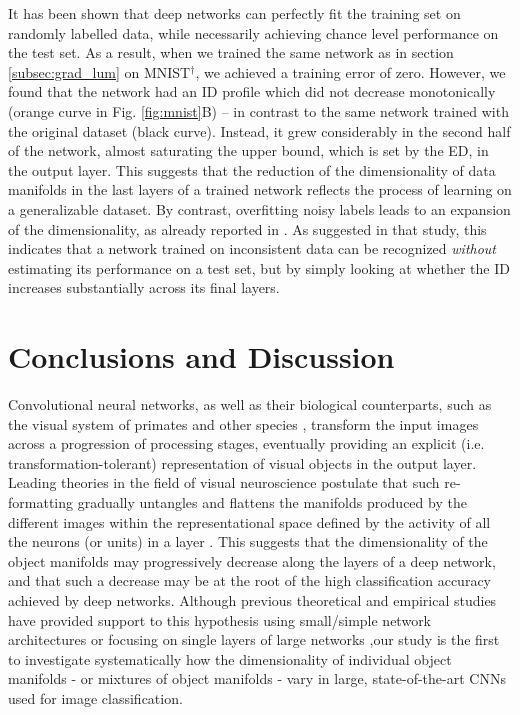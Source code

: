 \documentclass{article}
\begin{document}
It has been shown \cite{Zhang2017} that deep networks can perfectly fit the training set on randomly labelled data, while necessarily achieving chance level performance on the test set. As a result, when we trained the same network as in section \ref{subsec:grad_lum} on MNIST$^\dagger$, we achieved a training error of zero. However, we found that the network had an ID profile which did not decrease monotonically (orange curve in Fig. \ref{fig:mnist}B) -- in contrast to the same network trained with the original dataset (black curve). Instead, it grew considerably in the second half of the network, almost saturating the upper bound, which is set by the ED, in the output layer. 
This suggests that the reduction of the dimensionality of data manifolds in the last layers of a trained network reflects the process of learning on a generalizable dataset. By contrast, overfitting noisy labels leads to an expansion of the dimensionality, as already reported in \cite{Ma_2018}. As suggested in that study, this indicates that a network trained on inconsistent data can be recognized \emph{without} estimating its performance on a test set, but by simply looking at whether the ID increases substantially across its final layers.

\section{Conclusions and Discussion}

Convolutional neural networks, as well as their biological counterparts, such as the visual system of primates \cite{dicarlo2012does} and other species \cite{tafazoli2017emergence, matteucci2019nonlinear}, transform the input images across a progression of processing stages, eventually providing an explicit (i.e. transformation-tolerant) representation of visual objects in the output layer. Leading theories in the field of visual neuroscience postulate that such re-formatting gradually untangles and flattens the manifolds produced by the different images 
within the representational space defined by the activity of all the neurons (or units) in a layer \cite{dicarlo2012does, dicarlo2007untangling, olshausen2004sparse}. This suggests that the dimensionality of the object manifolds may progressively decrease along the layers of a deep network, and that such a decrease may be at the root of the high classification accuracy achieved by deep networks. Although previous theoretical and empirical studies have provided support to this hypothesis using small/simple network architectures or focusing on single layers of large networks \cite{huang2018mechanisms, yu2018curvature, Ma_2018,  basri2016efficient, chung2017manifolds, brahma2016deep},our study is the first to investigate systematically how the dimensionality of individual object manifolds - or mixtures of object manifolds - vary in large, state-of-the-art CNNs used for image classification.
\end{document}

